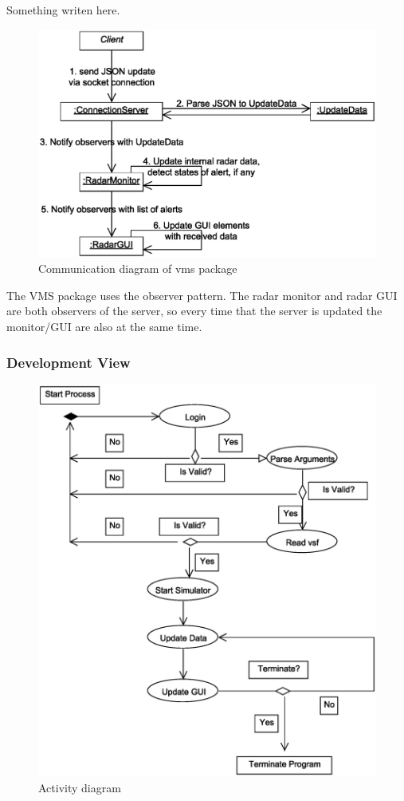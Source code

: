 \documentclass{article}
\begin{document}
Something writen here.

\begin{figure}[h]
\caption{Communication diagram of vms package}
\includegraphics[width=\linewidth]{diagrams/vms-communication-diagram.eps}
\end{figure}

The VMS package uses the observer pattern. The radar monitor and radar GUI are both observers of the server, so every time that the server is updated the monitor/GUI are also at the same time.

\subsubsection{Development View}


\begin{figure}[h]	
\caption{Activity diagram}
\includegraphics[width=\linewidth]{diagrams/activity-diagram.eps}
\end{figure}
\end{document}
